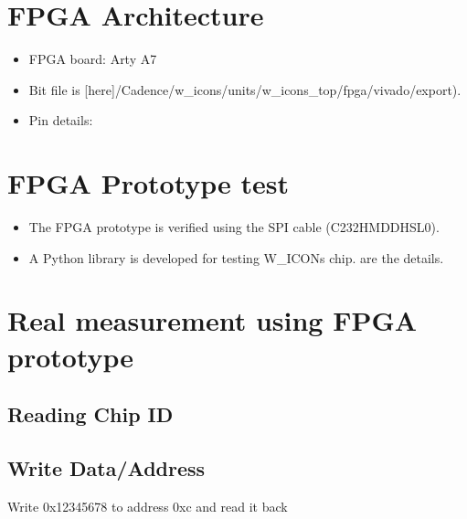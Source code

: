 \documentclass[letterpaper,10pt,english]{sphinxmanual}
\begin{document}
\section{FPGA Architecture}
\label{\detokenize{fpga_prototype:fpga-architecture}}\begin{itemize}
\item {} 
\sphinxAtStartPar
FPGA board: Arty A7 

\item {} 
\sphinxAtStartPar
Bit file is {[}here{]}/Cadence/w\_icons/units/w\_icons\_top/fpga/vivado/export).

\item {} 
\sphinxAtStartPar
Pin details:

\end{itemize}

\sphinxAtStartPar
{}


\section{FPGA Prototype test}
\label{\detokenize{fpga_prototype:fpga-prototype-test}}\begin{itemize}
\item {} 
\sphinxAtStartPar
The FPGA prototype is verified using the SPI cable (C232HM\sphinxhyphen{}DDHSL\sphinxhyphen{}0).

\item {} 
\sphinxAtStartPar
A Python library is developed for testing W\_ICONs chip.  are the details.

\end{itemize}


\section{Real measurement using FPGA prototype}
\label{\detokenize{fpga_prototype:real-measurement-using-fpga-prototype}}

\subsection{Reading Chip ID}
\label{\detokenize{fpga_prototype:reading-chip-id}}
\sphinxAtStartPar
{}


\subsection{Write Data/Address}
\label{\detokenize{fpga_prototype:write-data-address}}
\sphinxAtStartPar
Write 0x12345678 to address 0xc and read it back
\end{document}
